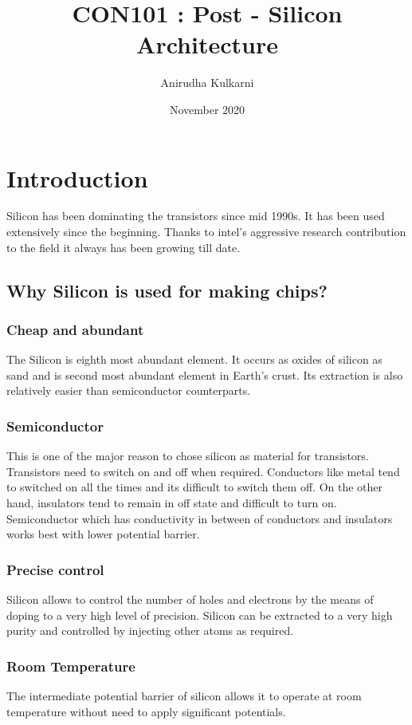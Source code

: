 \documentclass{article}
\title{CON101 : Post - Silicon Architecture}
\author{Anirudha Kulkarni}
\date{November 2020}
\begin{document}
\maketitle
\section{Introduction}
Silicon has been dominating the transistors since mid 1990s. It has been used extensively since the beginning. Thanks to intel's aggressive research contribution to the field it always has been growing till date.  
    \subsection{Why Silicon is used for making chips?}
        \subsubsection{Cheap and abundant}
        The Silicon is eighth most abundant element. It occurs as oxides of silicon as sand and is second most abundant element in Earth's crust. Its extraction is also relatively easier than semiconductor counterparts.
        \subsubsection{Semiconductor}
        This is one of the major reason to chose silicon as material for transistors. Transistors need to switch on and off when required. Conductors like metal tend to switched on all the times and its difficult to switch them off. On the other hand, insulators tend to remain in off state and difficult to turn on. Semiconductor which has conductivity in between of conductors and insulators works best with lower potential barrier.
        \subsubsection{Precise control}
        Silicon allows to control the number of holes and electrons by the means of doping to a very high level of precision. Silicon can be extracted to a very high purity and controlled by injecting other atoms as required.
        \subsubsection{Room Temperature}
        The intermediate potential barrier of silicon allows it to operate at room temperature without need to apply significant potentials.
\end{document}
